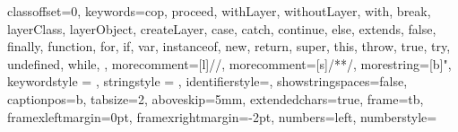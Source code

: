 \usepackage[formats]{listings}
\usepackage[T1]{fontenc}


\usepackage{soul}
\usepackage[scaled=.84]{DejaVuSansMono}


\newcommand{\code}[1]{\mbox{\texttt{#1}}} %
\newcommand{\scode}[1]{\texttt{\small{#1}}} %
\newcommand{\biglistingsfont}{ \ttfamily \normalsize \selectfont }
\newcommand{\listingsfont}{ \ttfamily \normalsize \selectfont }
\newcommand{\tinylistingsfont}{\rmfamily \fontsize{6.5}{6.5} \selectfont}





\newcommand{\layerclass}{\code{jcop.lang.Layer}\xspace}
\newcommand{\with}{\code{with}\xspace}
\newcommand{\without}{\code{without}\xspace}
\newcommand{\withoutall}{\code{withoutall}\xspace}
\newcommand{\layer}{\code{layer}\xspace}
\newcommand{\before}{\code{before}\xspace}
\newcommand{\after}{\code{after}\xspace}
\newcommand{\finalmod}{\code{final}\xspace}
\newcommand{\abstractmod}{\code{abstract}\xspace}
\newcommand{\proceed}{\code{proceed}\xspace} 
\newcommand{\ind}{\hspace*{1.5em}}



 {
      classoffset=0,
      keywords={cop, proceed, withLayer, withoutLayer, with, break,%
                layerClass, layerObject, createLayer, %
        case, catch, continue, else, extends,%
                false, finally, function, for, if, var, instanceof,%
                new, %
                return, super, this, throw,%
                true, try, undefined, while, },
      morecomment=[l]//,%
      morecomment=[s]{/*}{*/},%
      morestring=[b]",%
      keywordstyle = \color[rgb]{0.54,0.27,0.00},
      stringstyle = \color[rgb]{0.0,0.533,0.8},
      identifierstyle=,
      showstringspaces=false,
      captionpos=b,
      tabsize=2,
      aboveskip=5mm,
      extendedchars=true,
      frame=tb,
      framexleftmargin=0pt,
      framexrightmargin=-2pt,
      numbers=left,
      numberstyle=\tiny    
}


